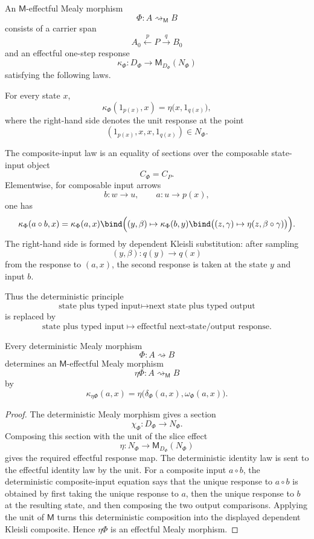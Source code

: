 \begin{definition}
\label{def:effectful-mealy-morphism}
An \(\mathsf M\)-effectful Mealy morphism
\[
\Phi:A\rightsquigarrow_{\mathsf M}B
\]
consists of a carrier span
\[
A_0\xleftarrow{p}P\xrightarrow{q}B_0
\]
and an effectful one-step response
\[
\kappa_\Phi:D_\Phi\to\mathsf M_{D_\Phi}(N_\Phi)
\]
satisfying the following laws.

For every state \(x\),
\[
\kappa_\Phi(1_{p(x)},x)
=
\eta\bigl(x,1_{q(x)}\bigr),
\]
where the right-hand side denotes the unit response at the point
\[
(1_{p(x)},x,x,1_{q(x)})\in N_\Phi .
\]

The composite-input law is an equality of sections over the composable state-input object
\[
C_\Phi=C_P .
\]
Elementwise, for composable input arrows
\[
b:w\to u,
\qquad
a:u\to p(x),
\]
one has
\[
\kappa_\Phi(a\circ b,x)
=
\kappa_\Phi(a,x)
\bind
\Bigl((y,\beta)\mapsto
\kappa_\Phi(b,y)
\bind
\bigl((z,\gamma)\mapsto
\eta(z,\beta\circ\gamma)\bigr)
\Bigr).
\]
The right-hand side is formed by dependent Kleisli substitution: after sampling
\[
(y,\beta):q(y)\to q(x)
\]
from the response to \((a,x)\), the second response is taken at the state \(y\) and input \(b\).
\end{definition}

Thus the deterministic principle
\[
\text{state plus typed input}
\longmapsto
\text{next state plus typed output}
\]
is replaced by
\[
\text{state plus typed input}
\longmapsto
\text{effectful next-state/output response}.
\]

\begin{theorem}
\label{thm:deterministic-mealy-embedding-effectful}
Every deterministic Mealy morphism
\[
\Phi:A\rightsquigarrow B
\]
determines an \(\mathsf M\)-effectful Mealy morphism
\[
\eta\Phi:A\rightsquigarrow_{\mathsf M}B
\]
by
\[
\kappa_{\eta\Phi}(a,x)
=
\eta
\bigl(\delta_\Phi(a,x),\omega_\Phi(a,x)\bigr).
\]
\end{theorem}

\begin{proof}
The deterministic Mealy morphism gives a section
\[
\chi_\Phi:D_\Phi\to N_\Phi .
\]
Composing this section with the unit of the slice effect
\[
\eta:N_\Phi\to \mathsf M_{D_\Phi}(N_\Phi)
\]
gives the required effectful response map.  The deterministic identity law is sent to the
effectful identity law by the unit.  For a composite input \(a\circ b\), the deterministic
composite-input equation says that the unique response to \(a\circ b\) is obtained by first taking
the unique response to \(a\), then the unique response to \(b\) at the resulting state, and then
composing the two output comparisons.  Applying the unit of \(\mathsf M\) turns this deterministic
composition into the displayed dependent Kleisli composite.  Hence \(\eta\Phi\) is an effectful
Mealy morphism.
\end{proof}

